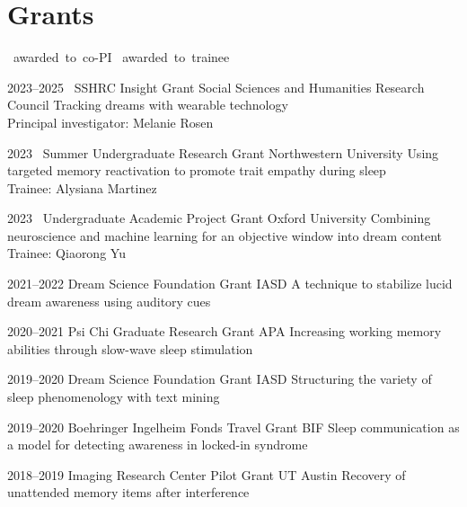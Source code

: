 \documentclass[11pt,a4paper,sans]{moderncv}
\newcommand*{\iconTrainee}{\faUserGraduate}
\newcommand*{\iconCoPI}{\faUserFriends}
\begin{document}
\begin{flushleft}
    \printbibliography[type=article,title={Articles},prenote=legendarticles]
\end{flushleft}

\section{Grants}  %

\iconCoPI~awarded~to~co-PI \hspace{8pt}
\iconTrainee~awarded~to~trainee \hfill
\vspace{8pt}

\cventry
    {2023--2025}
    {\iconCoPI~SSHRC Insight Grant}
    {Social Sciences and Humanities Research Council}{}{}
    {
        Tracking dreams with wearable technology\\
        Principal investigator: Melanie Rosen
    }

\cventry
    {2023}
    {\iconTrainee~Summer Undergraduate Research Grant}
    {Northwestern University}{}{}
    {
        Using targeted memory reactivation to promote trait empathy during sleep\\
        Trainee: Alysiana Martinez
    }

\cventry
    {2023}
    {\iconTrainee~Undergraduate Academic Project Grant}
    {Oxford University}{}{}
    {
        Combining neuroscience and machine learning for an objective window into dream content\\
        Trainee: Qiaorong Yu
    }

\cventry
    {2021--2022}
    {Dream Science Foundation Grant}
    {IASD}{}{}
    {A technique to stabilize lucid dream awareness using auditory cues}

\cventry
    {2020--2021}
    {Psi Chi Graduate Research Grant}
    {APA}{}{}
    {Increasing working memory abilities through slow-wave sleep stimulation}

\cventry
    {2019--2020}
    {Dream Science Foundation Grant}
    {IASD}{}{}
    {Structuring the variety of sleep phenomenology with text mining}

\cventry
    {2019--2020}
    {Boehringer Ingelheim Fonds Travel Grant}
    {BIF}{}{}
    {Sleep communication as a model for detecting awareness in locked-in syndrome}

\cventry
    {2018--2019}
    {Imaging Research Center Pilot Grant}
    {UT Austin}{}{}
    {Recovery of unattended memory items after interference}
\end{document}
